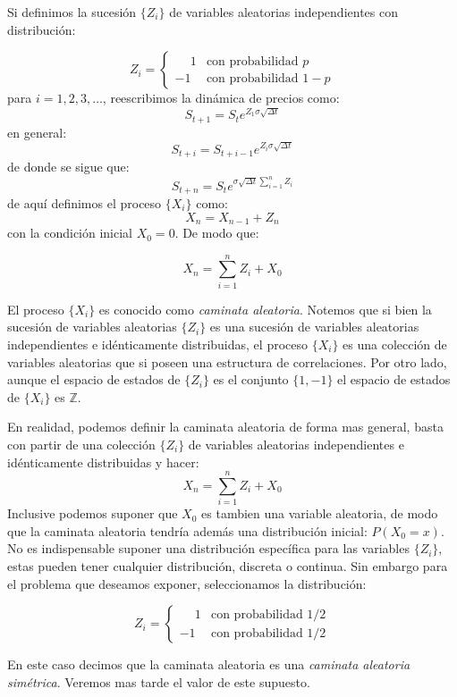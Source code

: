 \documentclass{extreport}
\theoremstyle{definicion}
\theoremstyle{propiedad}
\theoremstyle{teorema}
\begin{document}
Si definimos la sucesión $\{Z_i\}$ de variables aleatorias independientes con distribución:

$$
Z_i = \begin{cases} \phantom{-}1 & \text{con probabilidad }p  \\ 
-1 & \text{con probabilidad }1-p\end{cases}
$$
para $i = 1,2,3,\ldots$, reescribimos la dinámica de precios como:
$$
S_{t+1} = S_te^{Z_1\sigma\sqrt{\Delta t}}
$$
en general:
$$
S_{t+i} = S_{t+i-1}e^{Z_{i}\sigma\sqrt{\Delta t}}
$$
de donde se sigue que:
$$
S_{t+n} = S_{t}e^{\sigma\sqrt{\Delta t}\sum_{i=1}^nZ_i}
$$
de aquí definimos el proceso $\{X_i\}$  como:
$$
X_n = X_{n-1} + Z_n
$$
con la condición inicial $X_0 = 0$. De modo que:

$$
X_n = \sum_{i=1}^n Z_i + X_0
$$

El proceso $\{X_i\}$ es conocido como \emph{caminata aleatoria}. Notemos que si bien la sucesión de variables aleatorias $\{Z_i\}$ es una sucesión de variables aleatorias independientes e idénticamente distribuidas, el proceso $\{X_i\}$ es una colección de variables aleatorias que si poseen una estructura de correlaciones. Por otro lado, aunque el espacio de estados de $\{Z_i\}$ es el conjunto $\{1,-1\}$ el espacio de estados de $\{X_i\}$ es $\mathbb{Z}$. 

En realidad, podemos definir la caminata aleatoria de forma mas general, basta con partir de una colección $\{Z_i\}$ de variables aleatorias independientes e idénticamente distribuidas  y hacer:
$$
X_n = \sum_{i=1}^n Z_i + X_0
$$
Inclusive podemos suponer que $X_0$ es tambien una variable aleatoria, de modo que la caminata aleatoria tendría además una distribución inicial: $P(X_0 = x)$. No es indispensable suponer una distribución específica para las variables $\{Z_i\}$, estas pueden tener cualquier distribución, discreta o continua. Sin embargo para el problema que deseamos exponer, seleccionamos la distribución:

$$
Z_i = \begin{cases} \phantom{-}1 & \text{con probabilidad }1/2  \\ 
-1 & \text{con probabilidad }1/2\end{cases}
$$

En este caso decimos que la caminata aleatoria es una \emph{caminata aleatoria simétrica}. Veremos mas tarde el valor de este supuesto.
\end{document}
